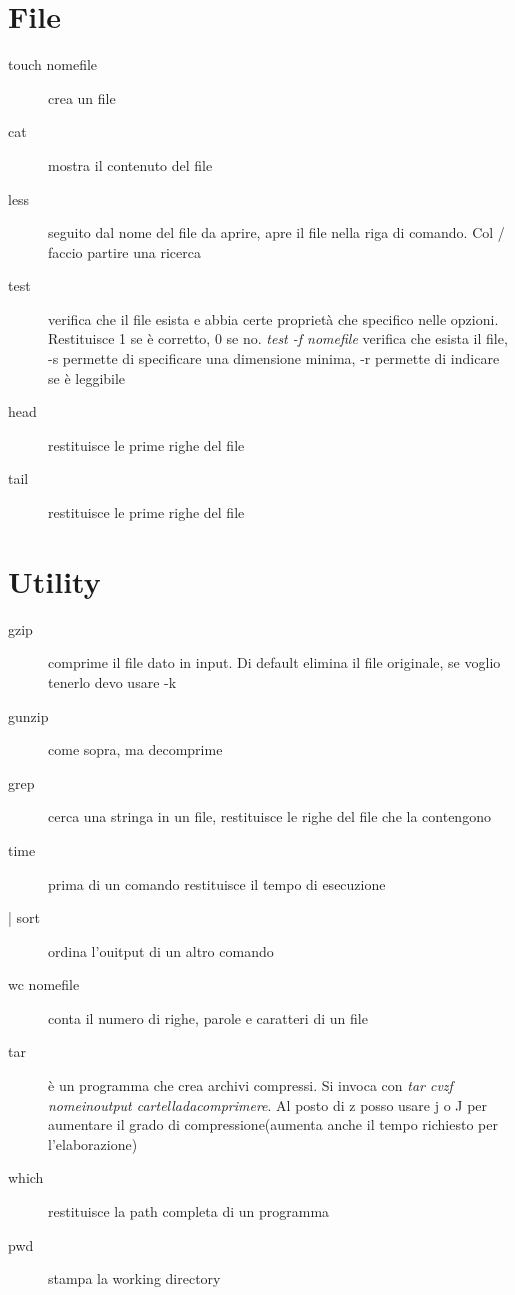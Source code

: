 \section{File}
\begin{description}
\item [touch nomefile] crea un file	\\
\item [cat] mostra il contenuto del file\\
\item [less] seguito dal nome del file da aprire, apre il file nella riga di comando. Col / faccio partire una ricerca\\
\item [test] verifica che il file esista e abbia certe proprietà che specifico nelle opzioni. Restituisce 1 se è corretto, 0 se no. 
\textit{test -f nomefile} verifica che esista il file, -s permette di specificare una dimensione minima, -r permette di indicare se è leggibile
\item [head] restituisce le prime righe del file
\item[tail] restituisce le prime righe del file
\end{description}

\section{Utility}
\begin{description}
\item [gzip] comprime il file dato in input. Di default elimina il file originale, se voglio tenerlo devo usare -k
\item [gunzip] come sopra, ma decomprime
\item [grep] cerca una stringa in un file, restituisce le righe del file che la contengono
\item [time] prima di un comando restituisce il tempo di esecuzione
\item [| sort] ordina l'ouitput di un altro comando
\item [wc nomefile] conta il numero di righe, parole e caratteri di un file
\item [tar] è un programma che crea archivi compressi. Si invoca con \textit{tar cvzf nomeinoutput cartelladacomprimere}. Al posto di z posso usare j o J per aumentare il grado di compressione(aumenta anche il tempo richiesto per l'elaborazione)
\item [which] restituisce la path completa di un programma
\item [pwd] stampa la working directory
\end{description}

